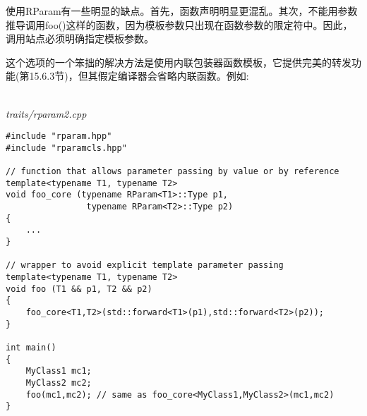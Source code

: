 使用RParam有一些明显的缺点。首先，函数声明明显更混乱。其次，不能用参数推导调用foo()这样的函数，因为模板参数只出现在函数参数的限定符中。因此，调用站点必须明确指定模板参数。

这个选项的一个笨拙的解决方法是使用内联包装器函数模板，它提供完美的转发功能(第15.6.3节)，但其假定编译器会省略内联函数。例如:

\hspace*{\fill} \\ %
\noindent
\textit{traits/rparam2.cpp}
\begin{lstlisting}[style=styleCXX]
#include "rparam.hpp"
#include "rparamcls.hpp"

// function that allows parameter passing by value or by reference
template<typename T1, typename T2>
void foo_core (typename RParam<T1>::Type p1,
				typename RParam<T2>::Type p2)
{
	...
}

// wrapper to avoid explicit template parameter passing
template<typename T1, typename T2>
void foo (T1 && p1, T2 && p2)
{
	foo_core<T1,T2>(std::forward<T1>(p1),std::forward<T2>(p2));
}

int main()
{
	MyClass1 mc1;
	MyClass2 mc2;
	foo(mc1,mc2); // same as foo_core<MyClass1,MyClass2>(mc1,mc2)
}
\end{lstlisting}











